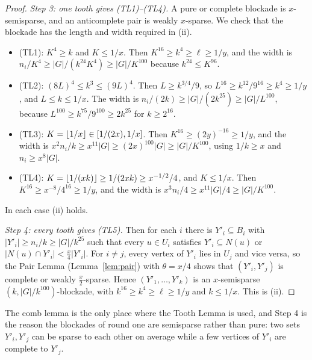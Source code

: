 \begin{proof}
\emph{Step 3: one tooth gives (TL1)--(TL4).} A pure or complete blockade is $x$-semisparse, and an
anticomplete pair is weakly $x$-sparse. We check that the blockade has the length and width required
in (ii).
\begin{itemize}[leftmargin=1.5em]
\item (TL1): $K^4\ge k$ and $K\le1/x$. Then $K^{16}\ge k^4\ge\ell\ge1/y$, and the width is $n_i/K^4\ge
  |G|/(k^{24}K^4)\ge|G|/K^{100}$ because $k^{24}\le K^{96}$.
\item (TL2): $(8L)^4\le k^3\le(9L)^4$. Then $L\ge k^{3/4}/9$, so $L^{16}\ge k^{12}/9^{16}\ge k^4\ge1/y$, and
  $L\le k\le1/x$. The width is $n_i/(2k)\ge|G|/(2k^{25})\ge|G|/L^{100}$, because $L^{100}\ge k^{75}/9^{100}\ge
  2k^{25}$ for $k\ge2^{16}$.
\item (TL3): $K=\lfloor 1/x\rfloor\in[1/(2x),1/x]$. Then $K^{16}\ge(2y)^{-16}\ge1/y$, and the width is $x^2n_i/k\ge
  x^{11}|G|\ge(2x)^{100}|G|\ge|G|/K^{100}$, using $1/k\ge x$ and $n_i\ge x^8|G|$.
\item (TL4): $K=\lfloor 1/(xk)\rfloor\ge1/(2xk)\ge x^{-1/2}/4$, and $K\le1/x$. Then $K^{16}\ge x^{-8}/4^{16}\ge1/y$, and
  the width is $x^3n_i/4\ge x^{11}|G|/4\ge|G|/K^{100}$.
\end{itemize}
In each case (ii) holds.

\emph{Step 4: every tooth gives (TL5).} Then for each $i$ there is $Y'_i\subseteq B_i$ with $|Y'_i|\ge
n_i/k\ge|G|/k^{25}$ such that every $u\in U_i$ satisfies $Y'_i\subseteq N(u)$ or $|N(u)\cap Y'_i|<\frac x4|Y'_i|$.
For $i\ne j$, every vertex of $Y'_i$ lies in $U_j$ and vice versa, so the Pair Lemma
(Lemma~\ref{lem:pair}) with $\theta=x/4$ shows that $(Y'_i,Y'_j)$ is complete or weakly $\frac x2$-sparse.
Hence $(Y'_1,\dots,Y'_k)$ is an $x$-semisparse $(k,|G|/k^{100})$-blockade, with $k^{16}\ge k^4\ge\ell\ge1/y$ and
$k\le1/x$. This is (ii).
\end{proof}

The comb lemma is the only place where the Tooth Lemma is used, and Step 4 is the reason the blockades
of round one are semisparse rather than pure: two sets $Y'_i,Y'_j$ can be sparse to each other on average
while a few vertices of $Y'_i$ are complete to $Y'_j$.
